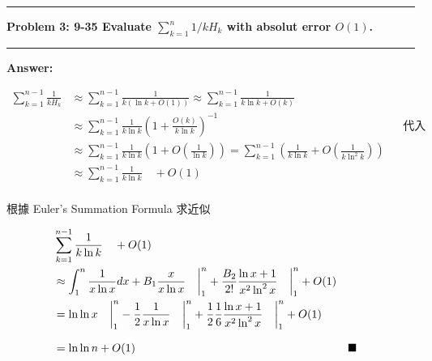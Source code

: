 \documentclass[11pt,fleqn]{article}
\newcommand\question[2]{\vspace{.25in}\hrule\textbf{#1: #2}\vspace{.5em}\hrule\vspace{.10in}}
\renewcommand\part[1]{\vspace{.10in}\textbf{#1}}
\begin{document}
\question{Problem 3} {9-35 Evaluate $\sum_{k=1}^{n} 1/k H_k$ with absolut error $O(1)$.
}

\part{Answer:}

\begin{align*}
	\sum\limits_{k=1}^{n-1} \frac{1}{k H_k} 
		&\approx \sum\limits_{k=1}^{n-1} \frac{1}{k(\ln k + O(1))} 
		 \approx \sum\limits_{k=1}^{n-1} \frac{1}{k\ln k + O(k)} \\
		&\approx \sum\limits_{k=1}^{n-1} \frac{1}{k\ln k} 
			\left(1 + \frac{O(k)}{k \ln k}\right)^{-1} && \text{代入 (9.34)}\\
		&\approx \sum\limits_{k=1}^{n-1} \frac{1}{k\ln k} 
			\left(1 + O\left(\frac{1}{\ln k}\right)\right) 
		= \sum\limits_{k=1}^{n-1} \left(\frac{1}{k\ln k} 
			+ O\left(\frac{1}{k \ln^2 k}\right)\right) \\
		&\approx \sum\limits_{k=1}^{n-1} \frac{1}{k\ln k} \quad + O(1) \\
\end{align*}

根據 Euler's Summation Formula 求近似

\begin{align*}
	&\sum\limits_{k=1}^{n-1} \frac{1}{k\ln k} \quad + O(1) \\
	&\approx \int^{n}_{1} \frac{1}{x \ln x} dx + B_1 \frac{x}{x \ln x} 
		\left.\phantom{0\over0} \right|^{n}_{1} + \frac{B_2}{2!} 
		\frac{\ln x + 1}{x^2 \ln^2 x} \left.\phantom{0\over0} \right|^{n}_{1} + O(1) \\
	&= \ln \ln x \left.\phantom{0\over0} \right|^{n}_{1} 
		- \frac{1}{2} \frac{1}{x \ln x} \left.\phantom{0\over0} \right|^{n}_{1}
		+ \frac{1}{2} \frac{1}{6} \frac{\ln x + 1}{x^2 \ln^2 x} 
			\left.\phantom{0\over0} \right|^{n}_{1} + O(1) \\
	&= \ln \ln n + O(1) \phantom{{0\over0}\over0} && \blacksquare
\end{align*}
\end{document}
